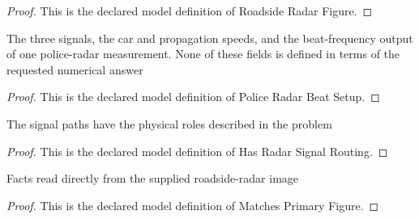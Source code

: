 \begin{proof}
  This is the declared model definition of Roadside Radar Figure.
\end{proof}
\begin{definition}
  \label{def:physics:phyx-mini-0525:phyxminiproblems-problemphyxmini0525-policeradarbeatsetup}
  The three signals, the car and propagation speeds, and the beat-frequency output of one police-radar measurement. None of these fields is defined in terms of the requested numerical answer
\end{definition}
\begin{proof}
  This is the declared model definition of Police Radar Beat Setup.
\end{proof}
\begin{definition}
  \label{def:physics:phyx-mini-0525:phyxminiproblems-problemphyxmini0525-hasradarsignalrouting}
  The signal paths have the physical roles described in the problem
\end{definition}
\begin{proof}
  This is the declared model definition of Has Radar Signal Routing.
\end{proof}
\begin{definition}
  \label{def:physics:phyx-mini-0525:phyxminiproblems-problemphyxmini0525-matchesprimaryfigure}
  Facts read directly from the supplied roadside-radar image
\end{definition}
\begin{proof}
  This is the declared model definition of Matches Primary Figure.
\end{proof}

